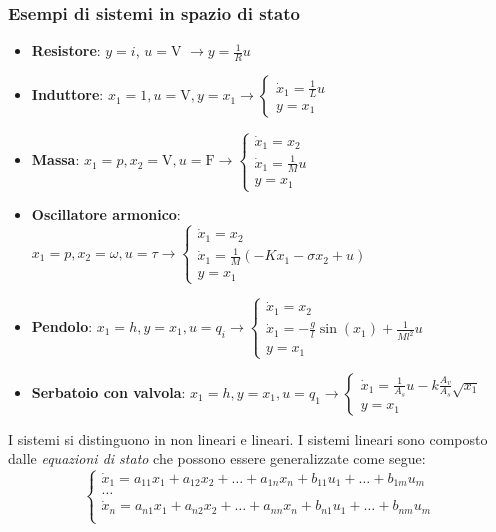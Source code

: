 	\subsubsection{Esempi di sistemi in spazio di stato}
	\begin{itemize}
		\item \textbf{Resistore}: $ y = i $, $ u = \text{V} $ $ \to y = \frac{1}{R}u $
		\item \textbf{Induttore}: $ x_1 = 1, u = \text{V}, y = x_1 \to \begin{cases}
			\dot{x}_1 = \frac{1}{L} u \\
			y = x_1
		\end{cases}$
		\item \textbf{Massa}: $ x_1 = p, x_2 = \text{V}, u = \text{F} \to \begin{cases}
			\dot{x}_1 = x_2\\
			\dot{x}_1 = \frac{1}{M}u\\
			y = x_1
		\end{cases}$	
		\item \textbf{Oscillatore armonico}: $ x_1 = p, x_2=\omega, u = \tau\to\begin{cases}
			\dot{x}_1=x_2\\
			\dot{x}_1 = \frac{1}{M}(-Kx_1-\sigma x_2 + u)\\
			y = x_1
		\end{cases} $
		
		\item \textbf{Pendolo}: $ x_1 =h,y=x_1,u=q_i \to\begin{cases}
			\dot{x}_1 = x_2\\
			\dot{x}_1 = -\frac{g}{l} \sin(x_1) + \frac{1}{Ml^2} u\\
			y = x_1
		\end{cases}$
		
		\item \textbf{Serbatoio con valvola}: $ x_1 = h, y = x_1,u=q_1\to \begin{cases}
			\dot{x}_1 = \frac{1}{A_s}u - k\frac{A_v}{A_s}\sqrt{x_1}\\
			y = x_1
		\end{cases} $
	\end{itemize}
	I sistemi si distinguono in non lineari e lineari.
	I sistemi lineari sono composto dalle \emph{equazioni di stato} che possono essere generalizzate come segue:
	\begin{equation*}
		\begin{cases}
			\dot{x}_1 = a_{11}x_1+a_{12}x_2+\dots+a_{1n}x_n+b_{11}u_1 + \dots+b_{1m}u_m\\
			\dots\\
			\dot{x}_n = a_{n1}x_1+a_{n2}x_2+\dots+a_{nn}x_n+b_{n1}u_1 + \dots+b_{nm}u_m\\
		\end{cases}
	\end{equation*}
